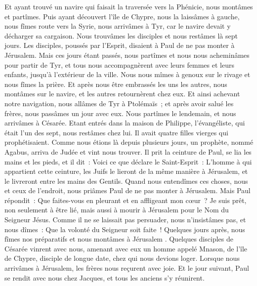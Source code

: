 \begin{multicols}{2}
Et ayant trouvé un navire qui faisait la traversée vers la Phénicie, nous montâmes et partîmes.
Puis ayant découvert l'île de Chypre, nous la laissâmes à gauche, nous fîmes route vers la Syrie, nous arrivâmes à Tyr, car le navire devait y décharger sa cargaison.
Nous trouvâmes les disciples et nous restâmes là sept jours. Les disciples, poussés par l'Esprit, disaient à Paul de ne pas monter à Jérusalem.
Mais ces jours étant passés, nous partîmes et nous nous acheminâmes pour partir de Tyr, et tous nous accompagnèrent avec leurs femmes et leurs enfants, jusqu'à l'extérieur de la ville. Nous nous mîmes à genoux sur le rivage et nous fîmes la prière.
Et après nous être embrassés les uns les autres, nous montâmes sur le navire, et les autres retournèrent chez eux.
Et ainsi achevant notre navigation, nous allâmes de Tyr à Ptolémaïs~; et après avoir salué les frères, nous passâmes un jour avec eux.
Nous partîmes le lendemain, et nous arrivâmes à Césarée. Etant entrés dans la maison de Philippe, l'évangéliste, qui était l'un des sept, nous restâmes chez lui.
Il avait quatre filles vierges qui prophétisaient.
Comme nous étions là depuis plusieurs jours, un prophète, nommé Agabus, arriva de Judée
et vint nous trouver. Il prit la ceinture de Paul, se lia les mains et les pieds, et il dit~: Voici ce que déclare le Saint-Esprit~: L'homme à qui appartient cette ceinture, les Juifs le lieront de la même manière à Jérusalem, et le livreront entre les mains des Gentils.
Quand nous entendîmes ces choses, nous et ceux de l'endroit, nous priâmes Paul de ne pas monter à Jérusalem.
Mais Paul répondit~: Que faites-vous en pleurant et en affligeant mon cœur~? Je suis prêt, non seulement à être lié, mais aussi à mourir à Jérusalem pour le Nom du Seigneur Jésus.
Comme il ne se laissait pas persuader, nous n'insistâmes pas, et nous dîmes~: Que la volonté du Seigneur soit faite~!
Quelques jours après, nous fîmes nos préparatifs et nous montâmes à Jérusalem .
Quelques disciples de Césarée vinrent avec nous, amenant avec eux un homme appelé Mnason, de l'île de Chypre, disciple de longue date, chez qui nous devions loger.
Lorsque nous arrivâmes à Jérusalem, les frères nous reçurent avec joie.
Et le jour suivant, Paul se rendit avec nous chez Jacques, et tous les anciens s'y réunirent.

\end{multicols}

